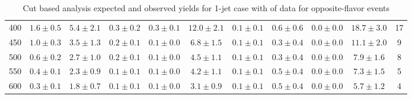 \begin{table}
{\begin{center}
\begin{tabular}{l c c c c c c c c c c }
400 & $1.6\pm0.5$ & $5.4\pm2.1$ & $0.3\pm0.2$ & $0.3\pm0.1$ & $12.0\pm2.1$ & $0.1\pm0.1$ & $0.6\pm0.6$ & $0.0\pm0.0$ & $18.7\pm3.0$ & 17 \\
450 & $1.0\pm0.3$ & $3.5\pm1.3$ & $0.2\pm0.1$ & $0.1\pm0.0$ & $6.8\pm1.5$ & $0.1\pm0.1$ & $0.3\pm0.4$ & $0.0\pm0.0$ & $11.1\pm2.0$ & 9 \\
500 & $0.6\pm0.2$ & $2.7\pm1.0$ & $0.2\pm0.1$ & $0.1\pm0.0$ & $4.5\pm1.1$ & $0.1\pm0.1$ & $0.3\pm0.4$ & $0.0\pm0.0$ & $7.9\pm1.6$ & 8 \\
550 & $0.4\pm0.1$ & $2.3\pm0.9$ & $0.1\pm0.1$ & $0.1\pm0.0$ & $4.2\pm1.1$ & $0.1\pm0.1$ & $0.5\pm0.4$ & $0.0\pm0.0$ & $7.3\pm1.5$ & 5 \\
600 & $0.3\pm0.1$ & $1.8\pm0.7$ & $0.1\pm0.1$ & $0.1\pm0.0$ & $3.1\pm0.9$ & $0.1\pm0.1$ & $0.5\pm0.4$ & $0.0\pm0.0$ & $5.7\pm1.2$ & 4 \\
\hline
\end{tabular}
\end{center}
}
\caption{Cut based analysis expected and observed yields for 1-jet case with \intlumi of data for opposite-flavor events}
\label{tab:cutbase_inputs_of_1j_data}
\end{table}


